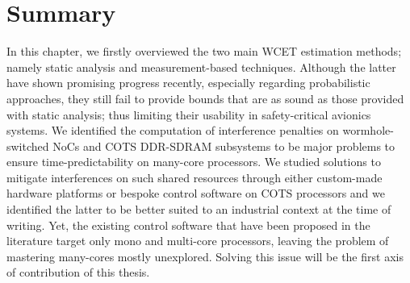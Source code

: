 \documentclass[main.tex]{subfiles}
\begin{document}
\section{Summary}
In this chapter, we firstly overviewed the two main WCET estimation methods; namely static analysis and measurement-based techniques. Although the latter have shown promising progress recently, especially regarding probabilistic approaches, they still fail to provide bounds that are as sound as those provided with static analysis; thus limiting their usability in safety-critical avionics systems. We identified the computation of interference penalties on wormhole-switched NoCs and COTS DDR-SDRAM subsystems to be major problems to ensure time-predictability on many-core processors. We studied solutions to mitigate interferences on such shared resources through either custom-made hardware platforms or bespoke control software on COTS processors and we identified the latter to be better suited to an industrial context at the time of writing. Yet, the existing control software that have been proposed in the literature target only mono and multi-core processors, leaving the problem of mastering many-cores mostly unexplored. Solving this issue will be the first axis of contribution of this thesis.







\clearpage
\subbiblio
\end{document}

